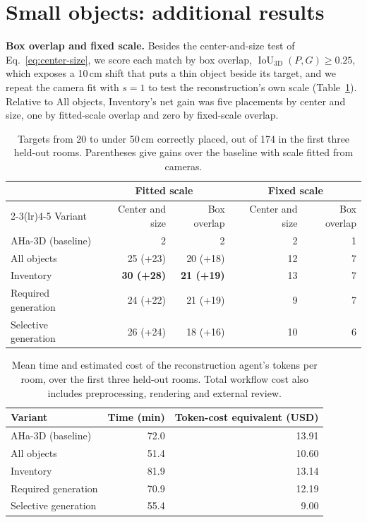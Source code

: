 \section{Small objects: additional results}
\label{app:small}
\textbf{Box overlap and fixed scale.} Besides the center-and-size test of
Eq.~\ref{eq:center-size}, we score each match by box overlap,
$\operatorname{IoU}_{3\mathrm{D}}(P,G)\ge 0.25$, which exposes a 10\,cm shift
that puts a thin object beside its target, and we repeat the camera fit with
$s=1$ to test the reconstruction's own scale
(Table~\ref{tab:small-placement}). Relative to All objects, Inventory's net
gain was five placements by center and size, one by fitted-scale overlap and
zero by fixed-scale overlap.

\begin{table}[!htbp]
\centering\small
\caption{Targets from 20 to under 50\,cm correctly placed, out of 174 in the
first three held-out rooms. Parentheses give gains over the baseline with
scale fitted from cameras.}
\label{tab:small-placement}
\begin{tabular}{lrrrr}
\toprule
& \multicolumn{2}{c}{Fitted scale} & \multicolumn{2}{c}{Fixed scale} \\
\cmidrule(lr){2-3}\cmidrule(lr){4-5}
Variant & Center and size & Box overlap & Center and size & Box overlap \\
\midrule
AHa-3D (baseline) & 2 & 2 & 2 & 1 \\
All objects & 25 (+23) & 20 (+18) & 12 & 7 \\
Inventory & \textbf{30 (+28)} & \textbf{21 (+19)} & 13 & 7 \\
\midrule
Required generation & 24 (+22) & 21 (+19) & 9 & 7 \\
Selective generation & 26 (+24) & 18 (+16) & 10 & 6 \\
\bottomrule
\end{tabular}
\end{table}

\begin{table}[!htbp]
\centering\small
\caption{Mean time and estimated cost of the reconstruction agent's
tokens per room, over the first three held-out rooms. Total workflow
cost also includes preprocessing, rendering and external review.}
\label{tab:existing-cost}
\begin{tabular}{lrr}
\toprule
Variant & Time (min) & Token-cost equivalent (USD) \\
\midrule
AHa-3D (baseline) & 72.0 & 13.91 \\
All objects & 51.4 & 10.60 \\
Inventory & 81.9 & 13.14 \\
Required generation & 70.9 & 12.19 \\
Selective generation & 55.4 & 9.00 \\
\bottomrule
\end{tabular}
\end{table}

